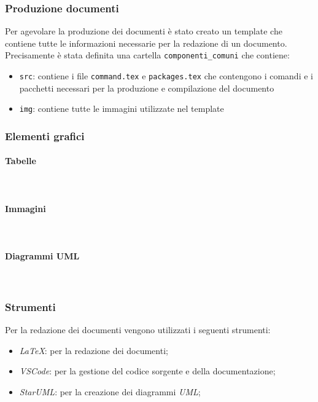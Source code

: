     \subsubsection{Produzione documenti}
    Per agevolare la produzione dei documenti è stato creato un template che contiene tutte le informazioni necessarie per la redazione di un documento.\\
    Precisamente è stata definita una cartella \texttt{componenti\_comuni} che contiene:
    \begin{itemize}
        \item \texttt{src}: contiene i file \texttt{command.tex} e \texttt{packages.tex} che contengono i comandi e i pacchetti necessari per la produzione e compilazione del documento
        \item \texttt{img}: contiene tutte le immagini utilizzate nel template
    \end{itemize}

    \subsubsection{Elementi grafici}
        \paragraph{Tabelle} ~

        \paragraph{Immagini} ~

        \paragraph{Diagrammi UML} ~

    \subsubsection{Strumenti}
        Per la redazione dei documenti vengono utilizzati i seguenti strumenti:
        \begin{itemize}
            \item \textit{LaTeX}: per la redazione dei documenti;
            \item \textit{VSCode}: per la gestione del codice sorgente e della documentazione;
            \item \textit{StarUML}: per la creazione dei diagrammi \textit{UML};
        \end{itemize}

